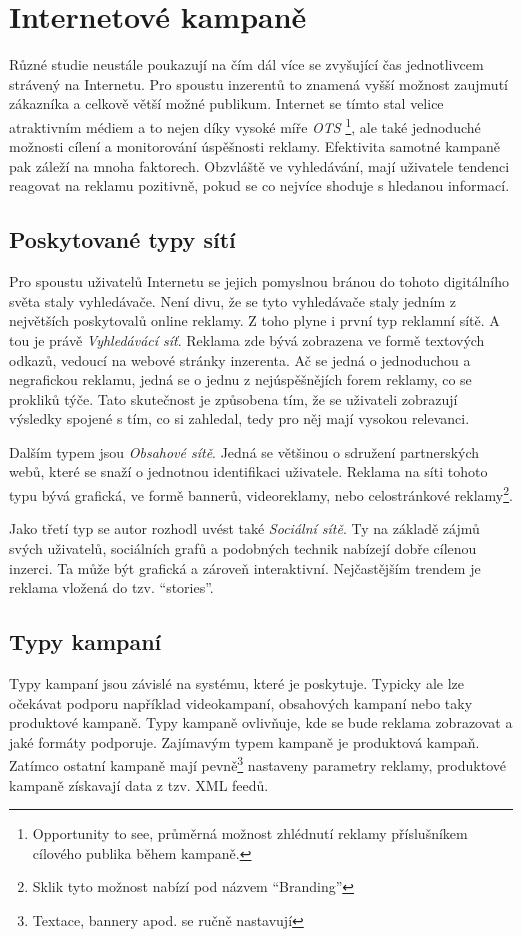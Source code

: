 \section{Internetové kampaně}
Různé studie neustále poukazují na čím dál více se zvyšující čas jednotlivcem strávený na Internetu. Pro spoustu inzerentů to znamená vyšší možnost
zaujmutí zákazníka a celkově větší možné publikum. Internet se tímto stal velice atraktivním médiem a to nejen díky vysoké míře \emph{OTS}
\footnote{Opportunity to see, průměrná možnost zhlédnutí reklamy příslušníkem cílového publika během kampaně.},
ale také jednoduché možnosti cílení a monitorování úspěšnosti reklamy. Efektivita samotné kampaně pak záleží na mnoha faktorech.
Obzvláště ve vyhledávání, mají uživatele tendenci reagovat na reklamu pozitivně, pokud se co nejvíce shoduje s hledanou informací.
\cite{klapdor:effect}


\subsection{Poskytované typy sítí}
Pro spoustu uživatelů Internetu se jejich pomyslnou bránou do tohoto digitálního světa staly vyhledávače. Není divu, že se tyto vyhledávače staly jedním z největších
poskytovalů online reklamy. Z toho plyne i první typ reklamní sítě. A tou je právě \emph{Vyhledávácí síť}. Reklama zde bývá zobrazena ve formě textových odkazů,
vedoucí na webové stránky inzerenta. Ač se jedná o jednoduchou a negrafickou reklamu, jedná se o jednu z nejúspěšnějích forem reklamy, co se prokliků týče. Tato skutečnost
je způsobena tím, že se uživateli zobrazují výsledky spojené s tím, co si zahledal, tedy pro něj mají vysokou relevanci.

Dalším typem jsou \emph{Obsahové sítě}. Jedná se většinou o sdružení partnerských webů, které se snaží o jednotnou identifikaci uživatele. Reklama na síti tohoto typu bývá
grafická, ve formě bannerů, videoreklamy, nebo celostránkové reklamy\footnote{Sklik tyto možnost nabízí pod názvem \enquote{Branding}}.

Jako třetí typ se autor rozhodl uvést také \emph{Sociální sítě}. Ty na základě zájmů svých uživatelů, sociálních grafů a podobných technik nabízejí dobře cílenou inzerci.
Ta může být grafická a zároveň interaktivní. Nejčastějším trendem je reklama vložená do tzv. \enquote{stories}.

\subsection{Typy kampaní}
Typy kampaní jsou závislé na systému, které je poskytuje. Typicky ale lze očekávat podporu například videokampaní, obsahových kampaní nebo taky produktové kampaně.
Typy kampaně ovlivňuje, kde se bude reklama zobrazovat a jaké formáty podporuje. Zajímavým typem kampaně je produktová kampaň. Zatímco ostatní kampaně mají
pevně\footnote{Textace, bannery apod. se ručně nastavují} nastaveny parametry reklamy, produktové kampaně získavají data z tzv. XML feedů. 

